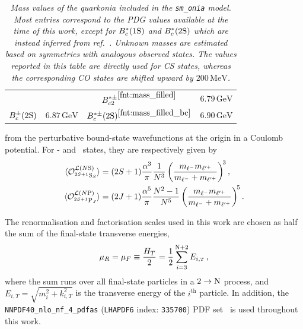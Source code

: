 \begin{table}[H]
\begin{tabular}[t]{cc|cc}
& & ${B_{c2}^{\ast \pm}}^{\ref{fnt:mass_filled}}$ & {$6.79\,\mathrm{GeV}$}\\
$B_c^\pm(2\mathrm{S})$ & $6.87\,\mathrm{GeV}$ & $B_c^{\ast \pm}(2\mathrm{S})^{\ref{fnt:mass_filled_bc}}$ & {$6.90\,\mathrm{GeV}$} \\
\bottomrule
\end{tabular}
\caption{\it\small Mass values of the quarkonia included in the {\tt sm\_onia} model. Most entries correspond to the PDG values available at the time of this work, except for $B_c^*(1\mathrm{S})$ and $B_c^*(2\mathrm{S})$ which are instead inferred from ref.~\cite{CMS:2019uhm}. Unknown masses are estimated based on symmetries with analogous observed states.
The values reported in this table are directly used for CS states, whereas the corresponding CO states are shifted upward by $200\,\mathrm{MeV}$.}
\label{tab:onia_masses}
\end{table}
\addtocounter{footnote}{1}
\noindent
from the perturbative bound-state wavefunctions at the origin in a Coulomb potential. For \swave- and \pwavetxt\ states, they are respectively given by
\begin{align}
    \langle \mathcal O_{^{2S+1}\mathrm{S}_S}^{{\mathcal L}(N\mathrm{S})} \rangle &= (2S+1)\dfrac{\alpha^3}{\pi}\dfrac{1}{N^3}\left(\dfrac{m_{\ell^-}m_{\ell^{\prime +}}}{m_{\ell^-}+m_{\ell^{\prime +}}}\right)^{\!3},\label{eq:ldme_leptonia_swave}\\
    \langle \mathcal O_{^{2S+1}\mathrm{P}_J}^{{\mathcal L}(N\mathrm{P})} \rangle &= (2J+1)\dfrac{\alpha^5}{\pi}\dfrac{N^2-1}{N^5}\left(\dfrac{m_{\ell^-}m_{\ell^{\prime +}}}{m_{\ell^-}+m_{\ell^{\prime +}}}\right)^{\!5}.\label{eq:ldme_leptonia_pwave}
\end{align}

The renormalisation and factorisation scales used in this work are chosen as half the sum of the final-state transverse energies,
\begin{equation}\label{eq:setup_mu}
    \mu_R = \mu_F \equiv \frac{H_T}{2} = \frac{1}{2} \sum_{i=3}^{{\rm N}+2} E_{i,{\scriptscriptstyle T} }\,,
\end{equation}
where the sum runs over all final-state particles in a $2 \to {\rm N}$ process, and $E_{i,{\scriptscriptstyle T}} = \sqrt{m_i^2 + k_{i,{\scriptscriptstyle T}}^2}$ is the transverse energy of the $i^{\mathrm{th}}$ particle.
In addition, the {\tt NNPDF40\_nlo\_nf\_4\_pdfas} ({\tt LHAPDF6} index: {\tt 335700}) PDF set~\cite{NNPDF:2021njg} is used throughout this work.

